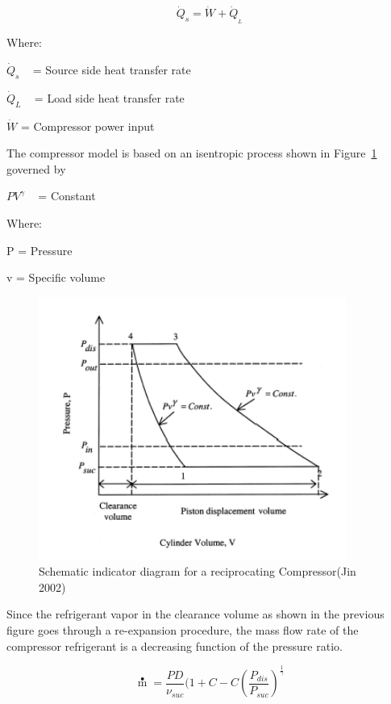 \begin{equation}
{\dot Q_s} = \dot W + {\dot Q_{_L}}
\end{equation}

Where:

\({\dot Q_s}\) ~ = Source side heat transfer rate

\({\dot Q_L}\) ~ = Load side heat transfer rate

\(\dot W\) = Compressor power input

The compressor model is based on an isentropic process shown in Figure~\ref{fig:schematic-indicator-diagram-for-a} governed by

\(P{V^\gamma }\) ~ = Constant

Where:

P = Pressure

v = Specific volume

\begin{figure}[hbtp] %
\centering
\includegraphics[width=0.9\textwidth, height=0.9\textheight, keepaspectratio=true]{media/image5296.png}
\caption{  Schematic indicator diagram for a reciprocating Compressor(Jin 2002) \protect \label{fig:schematic-indicator-diagram-for-a}}
\end{figure}

Since the refrigerant vapor in the clearance volume as shown in the previous figure goes through a re-expansion procedure, the mass flow rate of the compressor refrigerant is a decreasing function of the pressure ratio.

\begin{equation}
\mathop m\limits^ \bullet   = \frac{{PD}}{{\nu {}_{suc}}}(1 + C - C{(\frac{{P{}_{dis}}}{{P{}_{suc}}})^{\frac{1}{\gamma }}}
\end{equation}

